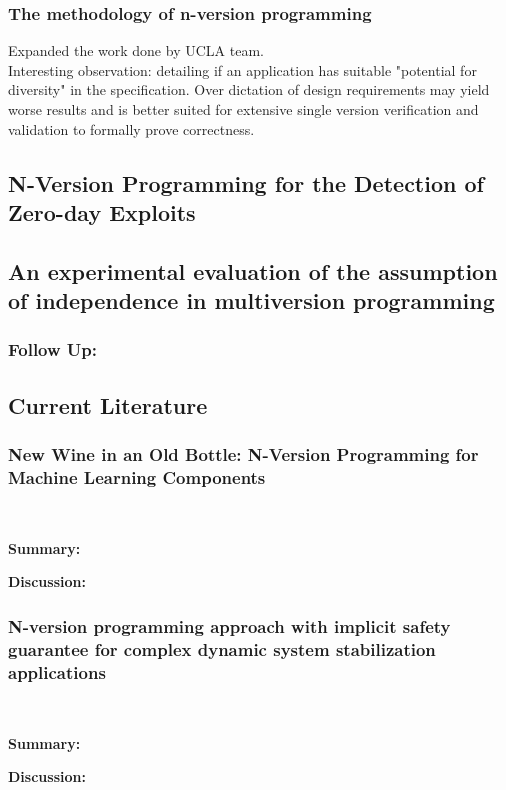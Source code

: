 \documentclass[article]{IEEEtran}
\begin{document}
\subsubsection{The methodology of n-version programming}
Expanded the work done by UCLA team. 
\\ 
Interesting observation: detailing if an application has suitable "potential for diversity" in the specification. Over dictation of design requirements may yield worse results and is better suited for extensive single version verification and validation to formally prove correctness. %

\cite{avizienis1995methodology}
\subsection{N-Version Programming for the Detection of Zero-day Exploits}
\cite{zerodayexp}
\subsection{An experimental evaluation of the assumption of independence in multiversion programming}
\cite{knightetal}
\subsubsection{Follow Up:}
\cite{kfollowup}



\subsection{Current Literature}
\subsubsection{New Wine in an Old Bottle: N-Version Programming for Machine Learning Components}
\cite{newwine}
\hfill\\
\par
\textbf{Summary:} 
\par
\textbf{Discussion:}

\subsubsection{N-version programming approach with implicit safety guarantee for complex dynamic system stabilization applications}
\cite{nadiretal}
\hfill\\
\par
\textbf{Summary:} 
\par
\textbf{Discussion:}
\end{document}
